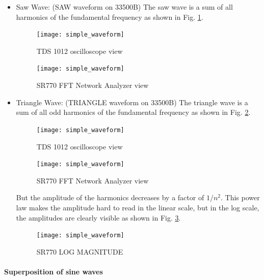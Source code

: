 \documentclass[../main.tex]{subfiles}
\begin{document}
\begin{itemize}
    \newpage
    \item Saw Wave: (SAW waveform on 33500B) The saw wave is a sum of all harmonics of the fundamental frequency as shown in Fig. \ref{fig:0.6}.
    \begin{figure}[ht]
        \centering
        \begin{minipage}{0.45\textwidth}
            \centering
            \texttt{[image: simple\_waveform]}
            \caption{TDS 1012 oscilloscope view}
            \label{fig:0.5}
        \end{minipage}\hfill
        \begin{minipage}{0.45\textwidth}
            \centering
            \texttt{[image: simple\_waveform]}
            \caption{SR770 FFT Network Analyzer view}
            \label{fig:0.6}
        \end{minipage}
    \end{figure}

    \item Triangle Wave: (TRIANGLE waveform on 33500B) The triangle wave is a sum of all odd harmonics of the fundamental frequency as shown in Fig. \ref{fig:0.8}.
    \begin{figure}[ht]
        \centering
        \begin{minipage}{0.45\textwidth}
            \centering
            \texttt{[image: simple\_waveform]}
            \caption{TDS 1012 oscilloscope view}
            \label{fig:0.7}
        \end{minipage} \hfill
        \begin{minipage}{0.45\textwidth}
            \centering
            \texttt{[image: simple\_waveform]}
            \caption{SR770 FFT Network Analyzer view}
            \label{fig:0.8}
        \end{minipage}\hfill
    \end{figure}
    But the amplitude of the harmonics decreases by a factor of $1/n^2$. This power law makes the amplitude hard to read in the linear scale,
    but in the log scale, the amplitudes are clearly visible as shown in Fig. \ref{fig:0.9}.
    \begin{figure}[ht]
        \centering
        \texttt{[image: simple\_waveform]}
        \caption{SR770 LOG MAGNITUDE}
        \label{fig:0.9}
    \end{figure}

\end{itemize}

\newpage

\paragraph*{Superposition of sine waves}
\end{document}
